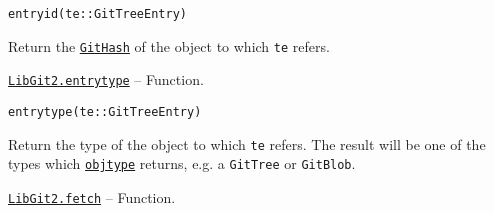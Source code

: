 \begin{adjustwidth}{2em}{0pt}


\begin{verbatim}
entryid(te::GitTreeEntry)
\end{verbatim}

Return the \hyperlink{202290709580230708}{\texttt{GitHash}} of the object to which \texttt{te} refers.



\end{adjustwidth}
\hypertarget{5430515144387502914}{}
\hyperlink{5430515144387502914}{\texttt{LibGit2.entrytype}}  -- {Function.}

\begin{adjustwidth}{2em}{0pt}


\begin{verbatim}
entrytype(te::GitTreeEntry)
\end{verbatim}

Return the type of the object to which \texttt{te} refers. The result will be one of the types which \hyperlink{5024227788763319693}{\texttt{objtype}} returns, e.g. a \texttt{GitTree} or \texttt{GitBlob}.



\end{adjustwidth}
\hypertarget{538444501253561978}{}
\hyperlink{538444501253561978}{\texttt{LibGit2.fetch}}  -- {Function.}


